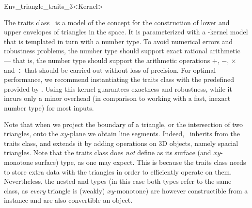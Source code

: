 
\ccRefPageBegin

\begin{ccRefClass}{Env_triangle_traits_3<Kernel>}
    
\ccDefinition 

The traits class \ccRefName\ is a model of the 
concept for the construction of lower and upper envelopes of triangles
in the space. It is parameterized with a \cgal-kernel model that is
templated in turn with a number type. To avoid numerical errors and
robustness problems, the number type should support exact rational
arithmetic --- that is, the number type should support the arithmetic
operations $+$, $-$, $\times$ and $\div$ that should be carried out
without loss of precision. For optimal performance, we recommend
instantiating the traits class with the predefined
 provided by \cgal.
Using this kernel guarantees exactness and robustness, while it incurs
only a minor overhead (in comparison to working with a fast, inexact number
type) for most inputs.

Note that when we project the boundary of a triangle, or the intersection
of two triangles, onto the $xy$-plane we obtain line segments. Indeed,
\ccRefName\ inherits from the  traits
class, and extends it by adding operations on 3D objects, namely spacial
triangles. Note that the traits class does {\sl not} define
 as its surface (and $xy$-monotone surface) type,
as one may expect. This is because the traits class needs to store extra data
with the triangles in order to efficiently operate on them. Nevertheless,
the nested  and  types (in this
case both types refer to the same class, as {\sl every} triangle is (weakly)
$xy$-monotone) are however constructible from a 
instance and are also convertible an  object.

 
\ccIsModel

\ccInheritsFrom

\end{ccRefClass}

\ccRefPageEnd
